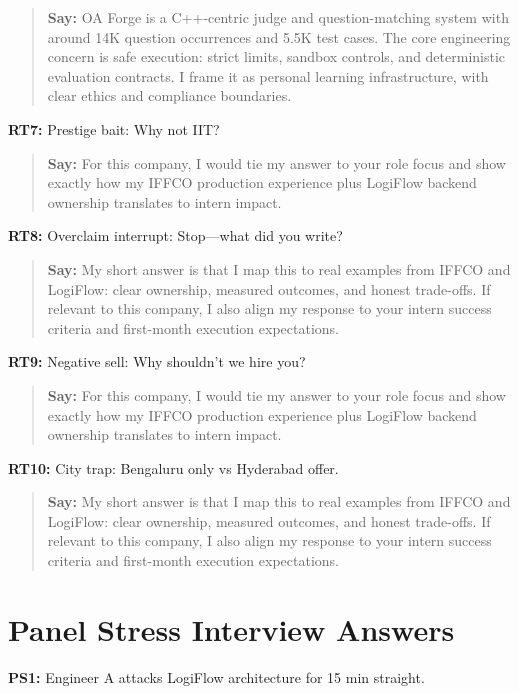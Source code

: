 \documentclass[9pt,a4paper]{article}
\begin{document}
\begin{quote}\small\textbf{Say:} OA Forge is a C++-centric judge and question-matching system with around 14K question occurrences and 5.5K test cases. The core engineering concern is safe execution: strict limits, sandbox controls, and deterministic evaluation contracts. I frame it as personal learning infrastructure, with clear ethics and compliance boundaries.\end{quote}
\vspace{2mm}
\textbf{RT7:} Prestige bait: Why not IIT?

\begin{quote}\small\textbf{Say:} For this company, I would tie my answer to your role focus and show exactly how my IFFCO production experience plus LogiFlow backend ownership translates to intern impact.\end{quote}
\vspace{2mm}
\textbf{RT8:} Overclaim interrupt: Stop---what did you write?

\begin{quote}\small\textbf{Say:} My short answer is that I map this to real examples from IFFCO and LogiFlow: clear ownership, measured outcomes, and honest trade-offs. If relevant to this company, I also align my response to your intern success criteria and first-month execution expectations.\end{quote}
\vspace{2mm}
\textbf{RT9:} Negative sell: Why shouldn't we hire you?

\begin{quote}\small\textbf{Say:} For this company, I would tie my answer to your role focus and show exactly how my IFFCO production experience plus LogiFlow backend ownership translates to intern impact.\end{quote}
\vspace{2mm}
\textbf{RT10:} City trap: Bengaluru only vs Hyderabad offer.

\begin{quote}\small\textbf{Say:} My short answer is that I map this to real examples from IFFCO and LogiFlow: clear ownership, measured outcomes, and honest trade-offs. If relevant to this company, I also align my response to your intern success criteria and first-month execution expectations.\end{quote}
\vspace{2mm}
\section{Panel Stress Interview Answers}
\textbf{PS1:} Engineer A attacks LogiFlow architecture for 15 min straight.
\end{document}
